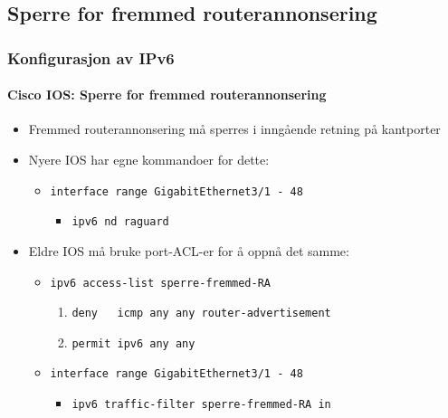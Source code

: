 \subsection{Sperre for fremmed routerannonsering}
\begin{frame}%
  \frametitle{Konfigurasjon av IPv6}
  \framesubtitle{Cisco IOS: Sperre for fremmed routerannonsering}
  \pause
  \begin{itemize}[<+->]
  \item Fremmed routerannonsering må sperres i inngående retning på
    kantporter
  \item Nyere IOS har egne kommandoer for dette:
    \begin{itemize}[<+->]
    \item \texttt{interface range GigabitEthernet3/1 - 48}
      \begin{itemize}[<+->]
      \item \texttt{ipv6 nd raguard}
      \end{itemize}
    \end{itemize}
  \item Eldre IOS må bruke port-ACL-er for å oppnå det samme:
    \begin{itemize}[<+->]
    \item \texttt{ipv6 access-list sperre-fremmed-RA}
      \begin{enumerate}[<+->]
      \item \texttt{deny\ \ \ icmp any any router-advertisement}
      \item \texttt{permit    ipv6 any any}
      \end{enumerate}
    \item \texttt{interface range GigabitEthernet3/1 - 48}
      \begin{itemize}[<+->]
      \item \texttt{ipv6 traffic-filter sperre-fremmed-RA in}
      \end{itemize}
    \end{itemize}
  \end{itemize}
\end{frame}

